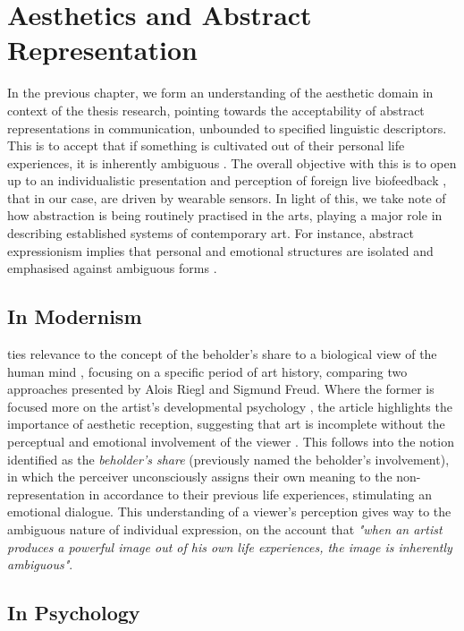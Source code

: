 \section{Aesthetics and Abstract Representation}
\label{lit_review:abstract}

In the previous chapter, we form an understanding of the aesthetic domain in context of the thesis research, pointing towards the acceptability of abstract representations in communication, unbounded to specified linguistic descriptors. This is to accept that if something is cultivated out of their personal life experiences, it is inherently ambiguous \cite{kaplan_esthetic_1948}. The overall objective with this is to open up to an individualistic presentation and perception of foreign live biofeedback \cite{lux_live_2018}, that in our case, are driven by wearable sensors. In light of this, we take note of how abstraction is being routinely practised in the arts, playing a major role in describing established systems of contemporary art. For instance, abstract expressionism implies that personal and emotional structures are isolated and emphasised against ambiguous forms \cite{pollock_action_2008}.

\subsection{In Modernism}

\citeauthor{kandel_two_2013} ties relevance to the concept of the beholder's share to a biological view of the human mind \cite{kandel_two_2013}, focusing on a specific period of art history, comparing two approaches presented by Alois Riegl and Sigmund Freud. Where the former is focused more on the artist's developmental psychology \cite{freud_leonardo_1999}, the article highlights the importance of aesthetic reception, suggesting that art is incomplete without the perceptual and emotional involvement of the viewer \cite{riegl_group_1999}. This follows into the notion identified as the \textit{beholder's share} (previously named the beholder's involvement), in which the perceiver unconsciously assigns their own meaning to the non-representation in accordance to their previous life experiences, stimulating an emotional dialogue. This understanding of a viewer's perception gives way to the ambiguous nature of individual expression, on the account that \textit{"when an artist produces a powerful image out of his own life experiences, the image is inherently ambiguous"}.

\subsection{In Psychology}

